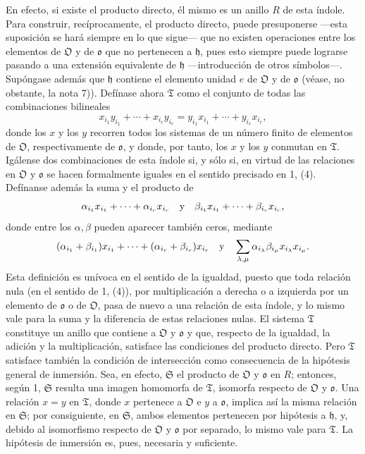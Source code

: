 En efecto, si existe el producto directo, él mismo es un anillo $R$ de esta índole. Para construir, recíprocamente, el producto directo, puede presuponerse ---esta suposición se hará siempre en lo que sigue--- que no existen operaciones entre los elementos de $\mathfrak O$ y de $\mathfrak o$ que no pertenecen a $\mathfrak h$, pues esto siempre puede lograrse pasando a una extensión equivalente de $\mathfrak h$ ---introducción de otros símbolos---. Supóngase además que $\mathfrak h$ contiene el elemento unidad $e$ de $\mathfrak O$ y de $\mathfrak o$ (véase, no obstante, la nota 7)). Defínase ahora $\mathfrak T$ como el conjunto de todas las combinaciones bilineales
\[
x_{i_1}y_{i_1}+\cdots+x_{i_r}y_{i_r}
 =y_{i_1}x_{i_1}+\cdots+y_{i_r}x_{i_r},
\]
donde los $x$ y los $y$ recorren todos los sistemas de un número finito de elementos de $\mathfrak O$, respectivamente de $\mathfrak o$, y donde, por tanto, los $x$ y los $y$ conmutan en $\mathfrak T$. Igálense dos combinaciones de esta índole si, y sólo si, en virtud de las relaciones en $\mathfrak O$ y $\mathfrak o$ se hacen formalmente iguales en el sentido precisado en 1, (4). Defínanse además la suma y el producto de
\[
\alpha_{i_1}x_{i_1}+\cdots+\alpha_{i_r}x_{i_r}
\quad\hbox{y}\quad
\beta_{i_1}x_{i_1}+\cdots+\beta_{i_r}x_{i_r},
\]
donde entre los $\alpha,\beta$ pueden aparecer también ceros, mediante
\[
(\alpha_{i_1}+\beta_{i_1})x_{i_1}+\cdots+(\alpha_{i_r}+\beta_{i_r})x_{i_r}
\quad\hbox{y}\quad
\sum_{\lambda,\mu}\alpha_{i_\lambda}\beta_{i_\mu}x_{i_\lambda}x_{i_\mu}.
\]
Esta definición es unívoca en el sentido de la igualdad, puesto que toda relación nula (en el sentido de 1, (4)), por multiplicación a derecha o a izquierda por un elemento de $\mathfrak o$ o de $\mathfrak O$, pasa de nuevo a una relación de esta índole, y lo mismo vale para la suma y la diferencia de estas relaciones nulas. El sistema $\mathfrak T$ constituye un anillo que contiene a $\mathfrak O$ y $\mathfrak o$ y que, respecto de la igualdad, la adición y la multiplicación, satisface las condiciones del producto directo. Pero $\mathfrak T$ satisface también la condición de intersección como consecuencia de la hipótesis general de inmersión. Sea, en efecto, $\mathfrak S$ el producto de $\mathfrak O$ y $\mathfrak o$ en $R$; entonces, según 1, $\mathfrak S$ resulta una imagen homomorfa de $\mathfrak T$, isomorfa respecto de $\mathfrak O$ y $\mathfrak o$. Una relación $x=y$ en $\mathfrak T$, donde $x$ pertenece a $\mathfrak O$ e $y$ a $\mathfrak o$, implica así la misma relación en $\mathfrak S$; por consiguiente, en $\mathfrak S$, ambos elementos pertenecen por hipótesis a $\mathfrak h$, y, debido al isomorfismo respecto de $\mathfrak O$ y $\mathfrak o$ por separado, lo mismo vale para $\mathfrak T$. La hipótesis de inmersión es, pues, necesaria y suficiente.

